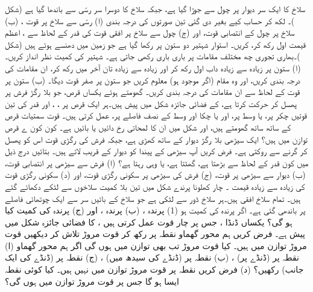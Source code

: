 \setcounter{questioncounter}{0}
سلاخ  کا ایک سر دیوار پر چول سے جوڑا گیا ہے، جبکہ سلاخ کا دوسرا سر  رسّی سے باندھا گیا ہے (شکل )۔ لکھ کر حساب کیے بغیر دی گئی تین صورتوں کی درجہ بندی  (ا)  رسّی سے سلاخ پر قوت ، (ب) سلاخ پر چول کے انتصابی قوت،  اور (ج) چول سے سلاخ پر افقی قوت کی قدر کے لحاظ سے ، اعظم قیمت اول رکھ کر، کریں۔
استوار شہتیر  دو ستون پر  رکھا گیا ہے جو زمین  میں دھنسے  ہوئے ہیں  (شکل )۔بھاری  تجوری چھ مختلف مقامات پر   باری باری رکھی جاتی ہے۔ شہتیر کی کمیت نظر انداز کریں۔ (ا)  ستون  پر زیادہ سے زیادہ داب اول رکھ کر اور زیادہ سے زیادہ تان آخر میں رکھ کر، ان مقامات  کی درجہ بندی کریں، اور وہ مقام  (اگر موجود ہو)  معلوم کریں جو ستون پر صفر قوت دیگا۔ (ب) ستون  پر قوت کے لحاظ سے ان مقامات کی درجہ بندی کریں۔
گھومتے ہوئے یکساں قرص، جو بلا رگڑ فرش پر  پھسل کر حرکت کرتا ہے،  کے  فضائی جائزہ شکل  میں پیش ہیں۔ہر ایک قرص پر ، ، اور  قدر کی تین قوتیں  چکر پر، یا وسط پر، اور یا چکا اور وسط کے نصف فاصلے پر، عمل کرتی ہیں۔ قوت سمتیات قرص کے ساتھ ساتھ گھومتے ہیں، اور شکل  میں  ان کا لمحاتی رخ دائیں یا بائیں ہے۔ کون کون ے قرص توازن میں ہیں؟
ایک سیڑھی بلا رگڑ دیوار کے ساتھ کھڑی ہے، جبکہ فرش کی رگڑی قوت اس کو پھسل کر گرنے سے روکتی ہے۔ فرض کریں آپ سیڑھی کے پیندا کو دیوار کے قریب لاتے ہیں۔ بتائیں درج ذیل میں کون قدر کے لحاظ سے بڑھتا ہے، گھٹتا ہے،  یا وہی رہتا ہے؟ (ا)  فرش  سے سیڑھی پر  انتصابی قوت،  (ب) دیوار سے سیڑھی پر قوت، (ج)  فرش کی سیڑھی پر سکونی رگڑی قوت، اور (د)  سکونی رگڑی قوت کی زیادہ سے زیادہ قیمت ۔
چار کھلونا  پرندے  شکل  میں تین بلا کمیت سلاخوں سے لٹکے  دکھائے گئے ہیں۔ تمام سلاخ افقی ہیں۔ہر سلاخ ڈور سے لٹکی ہے  جو سلاخ کے بائیں سر سے ایک چوتھائی فاصلے پر باندھی گئی ہے۔ اگر پرندہ  کی کمیت  ہو (1) پرندہ ، (ب) پرندہ ، اور (ج) پرندہ  کی کمیت کیا ہو  گی؟
یکساں ڈنڈا  ، جس پر چار قوت عمل کرتی ہیں ، کا فضائی جائزہ شکل  میں پیش ہے۔ فرض کریں ہم محور گھماو نقطہ  پر  رکھ کر  قوت مروڑ تلاش کر دیکھیں  قوت مروڑ  توازن میں ہیں۔ کیا قوت مروڑ تب بھی توازن میں ہوں گی اگر ہم محور گھماو (ا) نقطہ    پر (ڈنڈے پر) ، (ب) نقطہ  پر  (ڈنڈے کی سیدھ میں)  ،  (ج) نقطہ  پر (ڈنڈے کی ایک جانب)  رکھیں؟ (د)  فرض کریں نقطہ  پر قوت مروڑ  توازن میں نہیں ہیں۔ کیا کوئی  نقطہ ایسا ہو گا جس پر قوت مروڑ توازن میں ہوں گی؟
